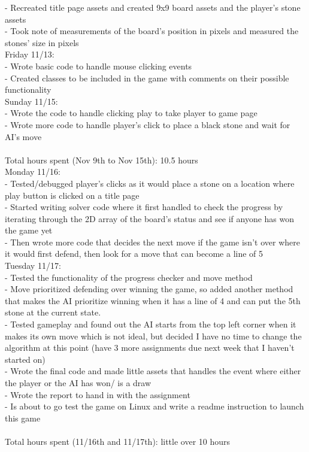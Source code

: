 \documentclass[a4paper]{article}
\begin{document}
\indent -	Recreated title page assets and created 9x9 board assets and the player’s stone assets\\
\indent -	Took note of measurements of the board’s position in pixels and measured the stones’ size in pixels\\
Friday 11/13:\\
\indent -	Wrote basic code to handle mouse clicking events\\
\indent -	Created classes to be included in the game with comments on their possible functionality\\
Sunday 11/15:\\
\indent -	Wrote the code to handle clicking play to take player to game page\\
\indent -	Wrote more code to handle player’s click to place a black stone and wait for AI’s move\\
\newline\\
Total hours spent (Nov 9th to Nov 15th): 10.5 hours
\newline\\
Monday 11/16:\\
\indent -	Tested/debugged player’s clicks as it would place a stone on a location where play button is clicked on a title page\\
\indent -	Started writing solver code where it first handled to check the progress by iterating through the 2D array of the board’s status and see if anyone has won the game yet\\
\indent -	Then wrote more code that decides the next move if the game isn’t over where it would first defend, then look for a move that can become a line of 5\\
Tuesday 11/17:\\
\indent -	Tested the functionality of the progress checker and move method\\
\indent -	Move prioritized defending over winning the game, so added another method that makes the AI prioritize winning when it has a line of 4 and can put the 5th stone at the current state.\\
\indent -	Tested gameplay and found out the AI starts from the top left corner when it makes its own move which is not ideal, but decided I have no time to change the algorithm at this point (have 3 more assignments due next week that I haven’t started on)\\
\indent -	Wrote the final code and made little assets that handles the event where either the player or the AI has won/ is a draw\\
\indent -	Wrote the report to hand in with the assignment\\
\indent -	Is about to go test the game on Linux and write a readme instruction to launch this game\\
\newline\\
Total hours spent (11/16th and 11/17th): little over 10 hours
\end{document}
